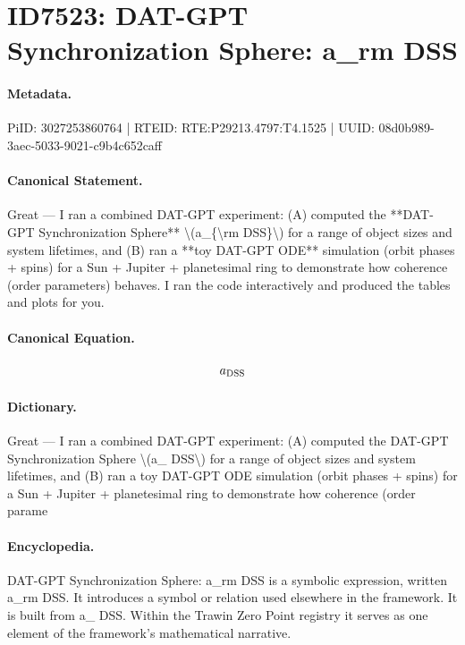 \section*{ID7523: DAT-GPT Synchronization Sphere: a\_rm DSS}
\paragraph{Metadata.}
PiID: 3027253860764 | RTEID: RTE:P29213.4797:T4.1525 | UUID: 08d0b989-3aec-5033-9021-c9b4c652caff

\paragraph{Canonical Statement.}
Great — I ran a combined DAT-GPT experiment: (A) computed the **DAT-GPT Synchronization Sphere** \textbackslash{}(a\_\{\textbackslash{}rm DSS\}\textbackslash{}) for a range of object sizes and system lifetimes, and (B) ran a **toy DAT-GPT ODE** simulation (orbit phases + spins) for a Sun + Jupiter + planetesimal ring to demonstrate how coherence (order parameters) behaves. I ran the code interactively and produced the tables and plots for you.

\paragraph{Canonical Equation.}
\[
a_{\rm DSS}
\]

\paragraph{Dictionary.}
Great — I ran a combined DAT-GPT experiment: (A) computed the DAT-GPT Synchronization Sphere \textbackslash{}(a\_ DSS\textbackslash{}) for a range of object sizes and system lifetimes, and (B) ran a toy DAT-GPT ODE simulation (orbit phases + spins) for a Sun + Jupiter + planetesimal ring to demonstrate how coherence (order parame

\paragraph{Encyclopedia.}
DAT-GPT Synchronization Sphere: a\_rm DSS is a symbolic expression, written a\_rm DSS. It introduces a symbol or relation used elsewhere in the framework. It is built from a\_ DSS. Within the Trawin Zero Point registry it serves as one element of the framework's mathematical narrative.

